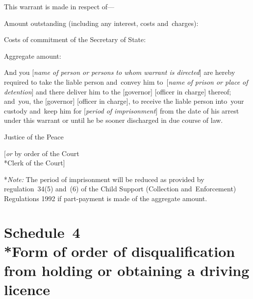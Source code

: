 \documentclass[12pt,a4paper]{article}
\begin{document}
\medskip

This warrant is made in respect of---

Amount outstanding (including any interest, 
costs and~charges):

Costs of commitment of the Secretary of State:

\medskip

Aggregate amount:

\medskip

And you [\emph{name of person or persons to whom warrant is directed}] are hereby required to take the liable person and~convey him to~[\emph{name of prison or place of detention}] and there deliver him to the [governor] [officer in charge] thereof; and~you, the [governor] [officer in charge], to receive the liable person into~your custody and~keep him for [\emph{period of imprisonment}] from the date of his arrest under this warrant or until he be sooner discharged in due course of law.

\medskip

{\raggedleft Justice of the Peace

\medskip

[\emph{or} by order of the Court\\*Clerk of the Court]

}

\medskip

*\emph{Note:} The period of imprisonment will be reduced as provided by regulation~34(5) and~(6) of the Child Support (Collection and~Enforcement) Regulations 1992 if part-payment is made of the aggregate amount.



\part[Schedule~4 --- Form of order of disqualification from holding or obtaining a driving licence]{Schedule~4\\*Form of order of disqualification from holding or obtaining a driving licence}

\renewcommand\parthead{--- Schedule~4}
\end{document}
